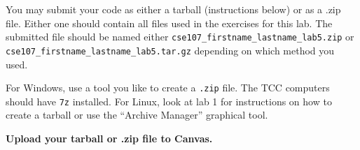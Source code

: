 \documentclass[11pt]{cselabheader}
\begin{document}
You may submit your code as either a tarball (instructions below) or as a .zip
file. Either one should contain all files used in the exercises for this lab.
The submitted file should be named either
\texttt{cse107\_firstname\_lastname\_lab5.zip} or
\texttt{cse107\_firstname\_lastname\_lab5.tar.gz} depending on which method you
used.

For Windows, use a tool you like to create a \texttt{.zip} file. The TCC
computers should have \texttt{7z} installed. For Linux, look at lab 1 for
instructions on how to create a tarball or use the ``Archive Manager'' graphical
tool.

\begin{center}
  \textbf{Upload your tarball or .zip file to Canvas.}
\end{center}
\end{document}
